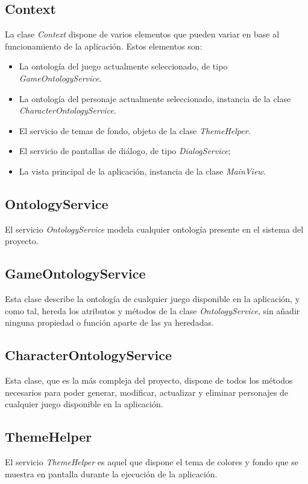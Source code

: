 \subsection{Context}
La clase \textit{Context} dispone de varios elementos que pueden variar en base al funcionamiento de la 
aplicación. Estos elementos son: 
\begin{itemize}
    \item La ontología del juego actualmente seleccionado, de tipo \textit{GameOntologyService}.
    \item La ontología del personaje actualmente seleccionado, instancia de la clase \textit{CharacterOntologyService}.
    \item El servicio de temas de fondo, objeto de la clase \textit{ThemeHelper}.
    \item El servicio de pantallas de diálogo, de tipo \textit{DialogService};
    \item La vista principal de la aplicación, instancia de la clase \textit{MainView}.
\end{itemize}

\subsection{OntologyService}
El servicio \textit{OntologyService} modela cualquier ontología presente en el sistema del proyecto.

\subsection{GameOntologyService}
Esta clase describe la ontología de cualquier juego disponible en la aplicación, y como tal, 
hereda los atributos y métodos de la clase \textit{OntologyService}, sin añadir ninguna propiedad 
o función aparte de las ya heredadas. 

\subsection{CharacterOntologyService}
Esta clase, que es la más compleja del proyecto, dispone de todos los métodos necesarios para 
poder generar, modificar, actualizar y eliminar personajes de cualquier juego disponible en la aplicación. 

\subsection{ThemeHelper}
El servicio \textit{ThemeHelper} es aquel que dispone el tema de colores y fondo que se muestra 
en pantalla durante la ejecución de la aplicación.

